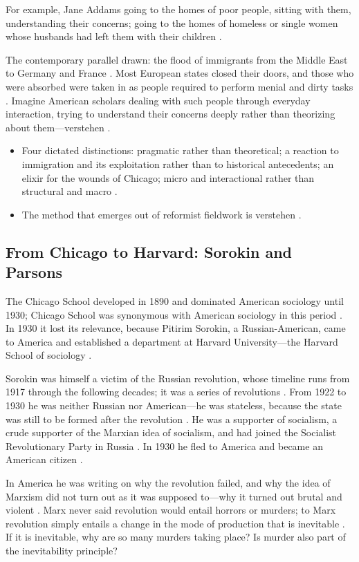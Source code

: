 For example, Jane Addams going to the homes of poor people, sitting with them, understanding their concerns; going to the homes of homeless or single women whose husbands had left them with their children .

The contemporary parallel drawn: the flood of immigrants from the Middle East to Germany and France . Most European states closed their doors, and those who were absorbed were taken in as people required to perform menial and dirty tasks . Imagine American scholars dealing with such people through everyday interaction, trying to understand their concerns deeply rather than theorizing about them---verstehen .

\begin{QuickRevision}
\begin{itemize}
    \item Four dictated distinctions: pragmatic rather than theoretical; a reaction to immigration and its exploitation rather than to historical antecedents; an elixir for the wounds of Chicago; micro and interactional rather than structural and macro .
    \item The method that emerges out of reformist fieldwork is verstehen .
\end{itemize}
\end{QuickRevision}

\subsection{From Chicago to Harvard: Sorokin and Parsons}
The Chicago School developed in 1890 and dominated American sociology until 1930; Chicago School was synonymous with American sociology in this period .
In 1930 it lost its relevance, because Pitirim Sorokin, a Russian-American, came to America and established a department at Harvard University---the Harvard School of sociology .

Sorokin was himself a victim of the Russian revolution, whose timeline runs from 1917 through the following decades; it was a series of revolutions . From 1922 to 1930 he was neither Russian nor American---he was stateless, because the state was still to be formed after the revolution .
He was a supporter of socialism, a crude supporter of the Marxian idea of socialism, and had joined the Socialist Revolutionary Party in Russia . In 1930 he fled to America and became an American citizen .

In America he was writing on why the revolution failed, and why the idea of Marxism did not turn out as it was supposed to---why it turned out brutal and violent . Marx never said revolution would entail horrors or murders; to Marx revolution simply entails a change in the mode of production that is inevitable . If it is inevitable, why are so many murders taking place? Is murder also part of the inevitability principle? 

